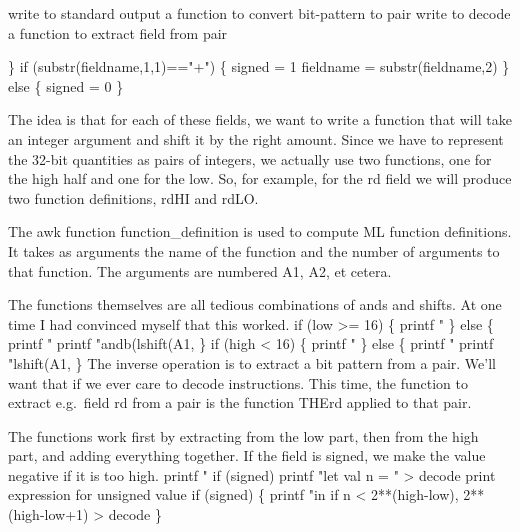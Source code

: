         \LA{}write to standard output a function to convert bit-pattern to pair\RA{}
        \LA{}write to \code{}decode\edoc{} a function to extract field from pair\RA{}

\}
\endcode
{}
\endmoddef
if (substr(fieldname,1,1)=="+") \{
        signed = 1
        fieldname = substr(fieldname,2)
\} else \{
        signed = 0
\}
\endcode
{}

The idea is that for each of these fields, we want to write a function
that will take an integer argument and shift it by the right amount.
Since we have to represent the 32-bit quantities as pairs of integers,
we actually use two functions, one for the high half and one for the low.
So, for example, for the \code{}rd\edoc{} field we will produce two function definitions,
\code{}rdHI\edoc{} and \code{}rdLO\edoc{}.

The awk function \code{}function_definition\edoc{} is used to compute ML function
definitions.
It takes as arguments the name of the function and the number of arguments
to that function.
The arguments are numbered \code{}A1\edoc{}, \code{}A2\edoc{}, et cetera.

The functions themselves are all tedious combinations of ands and shifts.
At one time I had convinced myself that this worked.
\enddocs
{}
\endmoddef
if (low >= 16) \{
        printf "%
\} else \{
        printf "%
        printf "andb(lshift(A1,%
\}
if (high < 16) \{
        printf "%
\} else \{
        printf "%
        printf "lshift(A1,%
\}
\endcode
{}
The inverse operation is
to extract a bit pattern from a pair.
We'll want that if we ever care to decode instructions.
This time, the function to extract e.g.\ field \code{}rd\edoc{} from a pair
is the function \code{}THErd\edoc{} applied to that pair.

The functions work first by extracting from the low part, then
from the high part, and adding everything together.
If the field is signed, we make the value negative if it is too high.
\enddocs
{}
\endmoddef
printf "%
if (signed) printf "let val n = " > decode
\LA{}print expression for unsigned value\RA{}
if (signed) \{
        printf "in if n < %
                2**(high-low), 2**(high-low+1) > decode
\}

